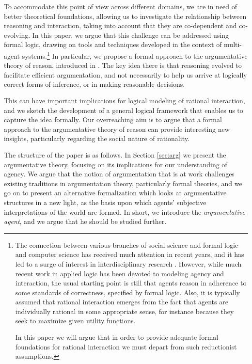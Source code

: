 \documentclass[greybox]{svmult}
\begin{document}
To accommodate this point of view across different domains, we are in need of better theoretical foundations, allowing us to investigate the relationship between reasoning and interaction, taking into account that they are co-dependent and co-evolving. In this paper, we argue that this challenge can be addressed using formal logic, drawing on tools and techniques developed in the context of multi-agent systems.\footnote{The connection between various branches of social science and formal logic and computer science has received much attention in recent years, and it has led to a surge of interest in interdisciplinary research \cite{parikh,benthem2,verbrugge}. However, while much recent work in applied logic has been devoted to modeling agency and interaction, the usual starting point is still that agents reason in adherence to some standards of correctness, specified by formal logic. Also, it is typically assumed that rational interaction emerges from the fact that agents are individually rational in some appropriate sense, for instance because they seek to maximize given utility functions. 

In this paper we will argue that in order to provide adequate formal foundations for rational interaction we must depart from such reductionist assumptions.} In particular, we propose a formal approach to the argumentative theory of reason, introduced in \cite{mercier}. The key idea there is that reasoning evolved to facilitate efficient argumentation, and not necessarily to help us arrive at logically correct forms of inference, or in making reasonable decisions.

This can have important implications for logical modeling of rational interaction, and we sketch the development of a general logical framework that enables us to capture the idea formally. Our overreaching aim is to argue that a formal approach to the argumentative theory of reason can provide interesting new insights, particularly regarding the social nature of rationality. 

The structure of the paper is as follows. In Section \ref{sec:arg} we present the argumentative theory, focusing on its implications for our understanding of agency. We argue that the notion of argumentation that is at work challenges existing traditions in argumentation theory, particularly formal theories, and we go on to present an alternative formalization which looks at argumentative structures in a new light, as the basis upon which agents' subjective interpretations of the world are formed. In short, we introduce the \emph{argumentative agent}, and we argue that he should be studied further.
\end{document}
